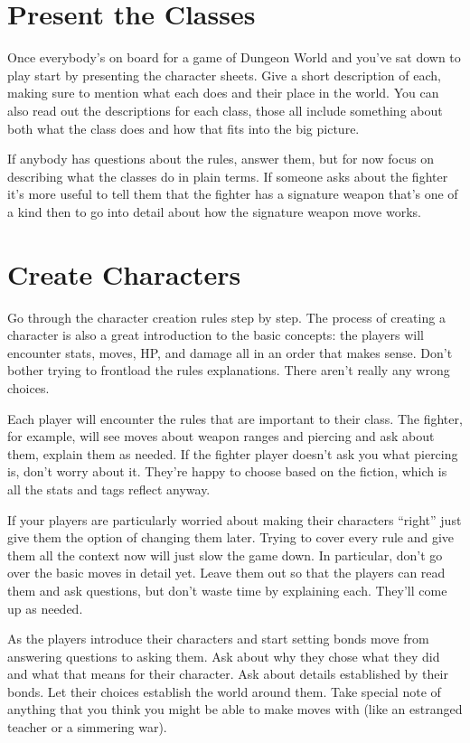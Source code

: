 \section*{Present the Classes}


Once everybody's on board for a game of Dungeon World and you've sat down to play start by presenting the character sheets. Give a short description of each, making sure to mention what each does and their place in the world. You can also read out the descriptions for each class, those all include something about both what the class does and how that fits into the big picture.


If anybody has questions about the rules, answer them, but for now focus on describing what the classes do in plain terms. If someone asks about the fighter it's more useful to tell them that the fighter has a signature weapon that's one of a kind then to go into detail about how the signature weapon move works.
\section*{Create Characters}


Go through the character creation rules step by step. The process of creating a character is also a great introduction to the basic concepts: the players will encounter stats, moves, HP, and damage all in an order that makes sense. Don't bother trying to frontload the rules explanations. There aren't really any wrong choices.


Each player will encounter the rules that are important to their class. The fighter, for example, will see moves about weapon ranges and piercing and ask about them, explain them as needed. If the fighter player doesn't ask you what piercing is, don't worry about it. They're happy to choose based on the fiction, which is all the stats and tags reflect anyway.


If your players are particularly worried about making their characters ``right'' just give them the option of changing them later. Trying to cover every rule and give them all the context now will just slow the game down. In particular, don't go over the basic moves in detail yet. Leave them out so that the players can read them and ask questions, but don't waste time by explaining each. They'll come up as needed.


As the players introduce their characters and start setting bonds move from answering questions to asking them. Ask about why they chose what they did and what that means for their character. Ask about details established by their bonds. Let their choices establish the world around them. Take special note of anything that you think you might be able to make moves with (like an estranged teacher or a simmering war).
